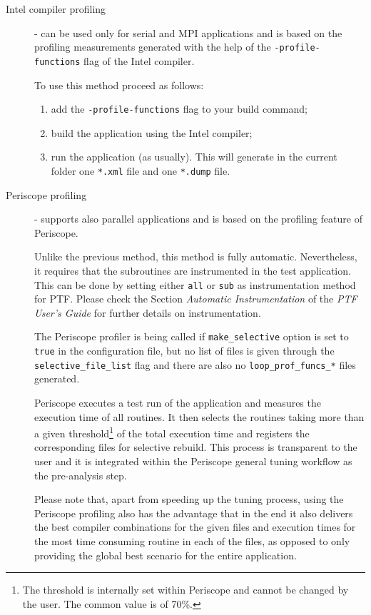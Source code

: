\documentclass[11pt,a4paper, oneside]{book} %
\begin{document}
\begin{description}

\item[Intel compiler profiling] - can be used only for serial and MPI applications and is based on the profiling measurements generated with the help of the \texttt{-profile-functions} flag of the Intel compiler.

To use this method proceed as follows:
\begin{enumerate}
	\item add the \texttt{-profile-functions} flag to your build command;
	\item build the application using the Intel compiler;
	\item run the application (as usually). This will generate in the current folder one \texttt{*.xml} file and one \texttt{*.dump} file.
\end{enumerate}

\item[Periscope profiling] - supports also parallel applications and is based on the profiling feature of Periscope.

Unlike the previous method, this method is fully automatic. Nevertheless, it requires that the subroutines are instrumented in the test application. This can be done by setting either \texttt{all} or \texttt{sub} as instrumentation method for PTF. Please check the Section \textit{Automatic Instrumentation} of the \textit{PTF User's Guide} for further details on instrumentation.

The Periscope profiler is being called if \texttt{make\_selective} option is set to \texttt{true} in the configuration file, but no list of files is given through the \texttt{selective\_file\_list} flag and there are also no \texttt{loop\_prof\_funcs\_*} files generated.

Periscope executes a test run of the application and measures the execution time of all routines. It then selects the routines taking more than a given threshold\footnote{The threshold is internally set within Periscope and cannot be changed by the user. The common value is of 70\%.} of the total execution time and registers the corresponding files for selective rebuild. This process is transparent to the user and it is integrated within the Periscope general tuning workflow as the pre-analysis step.

Please note that, apart from speeding up the tuning process, using the Periscope profiling also has the advantage that in the end it also delivers the best compiler combinations for the given files and execution times for the most time consuming routine in each of the files, as opposed to only providing the global best scenario for the entire application.

\end{description}
\end{document}
